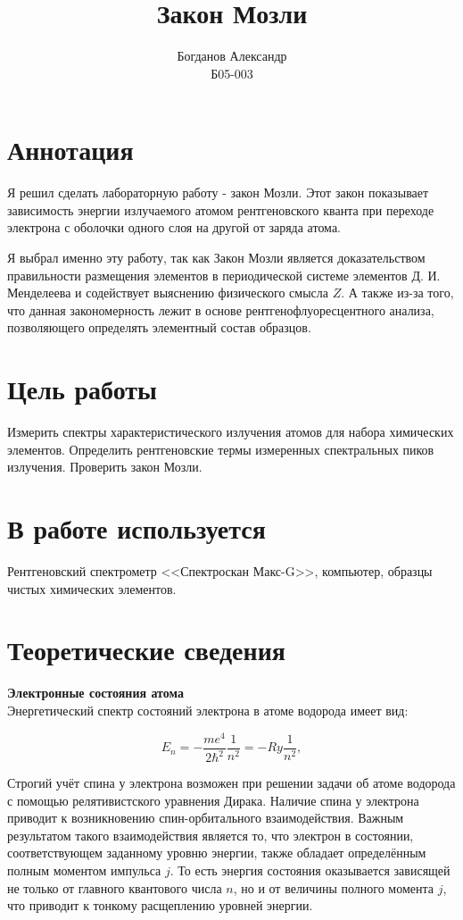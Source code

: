 \documentclass[a4paper, 12pt]{article}%
\author{Богданов Александр \\
	Б05-003}
\title{\textbf{Закон Мозли}}
\begin{document}
\maketitle

    \section*{Аннотация}

		Я решил сделать лабораторную работу - закон Мозли.  Этот закон показывает зависимость энергии излучаемого атомом рентгеновского кванта при переходе электрона с оболочки одного слоя на другой от заряда атома. 
	
		Я выбрал именно эту работу,  так как Закон Мозли является доказательством правильности размещения элементов в периодической системе элементов Д. И. Менделеева и содействует выяснению физического смысла $Z$.  А также из-за того,  что данная закономерность лежит в основе рентгенофлуоресцентного анализа,  позволяющего определять элементный состав образцов.

    \section*{Цель работы}

		Измерить спектры характеристического излучения атомов для набора химических элементов.  Определить рентгеновские термы измеренных спектральных пиков излучения.  Проверить закон Мозли.

    \section*{В работе используется}

		Рентгеновский спектрометр <<Спектроскан Макс-G>>,  компьютер,  образцы чистых химических элементов.
		
    \section*{Теоретические сведения}
		
		\textbf{Электронные состояния атома}\\
	
		Энергетический спектр состояний электрона в атоме водорода имеет вид:

		\[E_n = -\frac{me^4}{2\hbar^2} \frac{1}{n^2} = -Ry \frac{1}{n^2}, \]
			
		Строгий учёт спина у электрона возможен при решении задачи об атоме водорода с помощью релятивистского уравнения Дирака.  Наличие спина у электрона приводит к возникновению спин-орбитального взаимодействия.  Важным результатом такого взаимодействия является то,  что электрон в состоянии,  соответствующем заданному уровню энергии,  также обладает определённым полным моментом импульса $j$.  То есть энергия состояния оказывается зависящей не только от главного квантового числа $n$,  но и от величины полного момента $j$, что приводит к тонкому расщеплению уровней энергии. 
\end{document}
